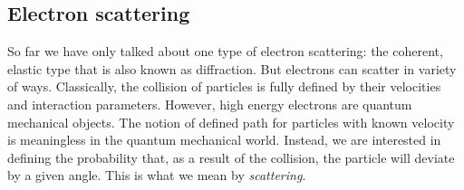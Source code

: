 \subsection{Electron scattering}
\label{sec:scatter}

So far we have only talked about one type of electron scattering: the coherent, elastic type that is also known as diffraction. But electrons can scatter in variety of ways.  Classically, the collision of particles is fully defined by their velocities and interaction parameters. However, high energy electrons are quantum mechanical objects. The notion of defined path for particles with known velocity is meaningless in the quantum mechanical world. Instead, we are interested in defining the probability that, as a result of the collision, the particle will deviate by a given angle. This is what we mean by \textit{scattering}.

